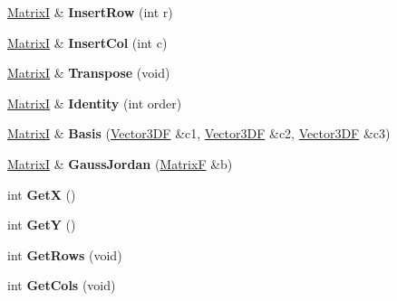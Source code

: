 \begin{DoxyCompactItemize}
\item 
\hypertarget{class_matrix_i_aeac94fe12328eca437c122286eb3f8a7}{\hyperlink{class_matrix_i}{Matrix\+I} \& {\bfseries Insert\+Row} (int r)}\label{class_matrix_i_aeac94fe12328eca437c122286eb3f8a7}

\item 
\hypertarget{class_matrix_i_af70365817e6306ffddf06b31915eae65}{\hyperlink{class_matrix_i}{Matrix\+I} \& {\bfseries Insert\+Col} (int c)}\label{class_matrix_i_af70365817e6306ffddf06b31915eae65}

\item 
\hypertarget{class_matrix_i_a15d089b04c45bfdf6d54b1c36cc2d417}{\hyperlink{class_matrix_i}{Matrix\+I} \& {\bfseries Transpose} (void)}\label{class_matrix_i_a15d089b04c45bfdf6d54b1c36cc2d417}

\item 
\hypertarget{class_matrix_i_a8c8eebaf06a2057a6e59953230a1e3a7}{\hyperlink{class_matrix_i}{Matrix\+I} \& {\bfseries Identity} (int order)}\label{class_matrix_i_a8c8eebaf06a2057a6e59953230a1e3a7}

\item 
\hypertarget{class_matrix_i_af5e4e08c7b8253d9ed3216a8fc0e4317}{\hyperlink{class_matrix_i}{Matrix\+I} \& {\bfseries Basis} (\hyperlink{class_vector3_d_f}{Vector3\+D\+F} \&c1, \hyperlink{class_vector3_d_f}{Vector3\+D\+F} \&c2, \hyperlink{class_vector3_d_f}{Vector3\+D\+F} \&c3)}\label{class_matrix_i_af5e4e08c7b8253d9ed3216a8fc0e4317}

\item 
\hypertarget{class_matrix_i_a9954b0bb983d9526ae63b708bf495849}{\hyperlink{class_matrix_i}{Matrix\+I} \& {\bfseries Gauss\+Jordan} (\hyperlink{class_matrix_f}{Matrix\+F} \&b)}\label{class_matrix_i_a9954b0bb983d9526ae63b708bf495849}

\item 
\hypertarget{class_matrix_i_a2c5e97e3253fa6745041b107b989b15d}{int {\bfseries Get\+X} ()}\label{class_matrix_i_a2c5e97e3253fa6745041b107b989b15d}

\item 
\hypertarget{class_matrix_i_a401284afbb51e934430822ee28a93450}{int {\bfseries Get\+Y} ()}\label{class_matrix_i_a401284afbb51e934430822ee28a93450}

\item 
\hypertarget{class_matrix_i_aac184c5aa96e394ea060b9b2b7e93b0b}{int {\bfseries Get\+Rows} (void)}\label{class_matrix_i_aac184c5aa96e394ea060b9b2b7e93b0b}

\item 
\hypertarget{class_matrix_i_af98a8d5d4e4c3746ec572a433b2b04ff}{int {\bfseries Get\+Cols} (void)}\label{class_matrix_i_af98a8d5d4e4c3746ec572a433b2b04ff}


\end{DoxyCompactItemize}
